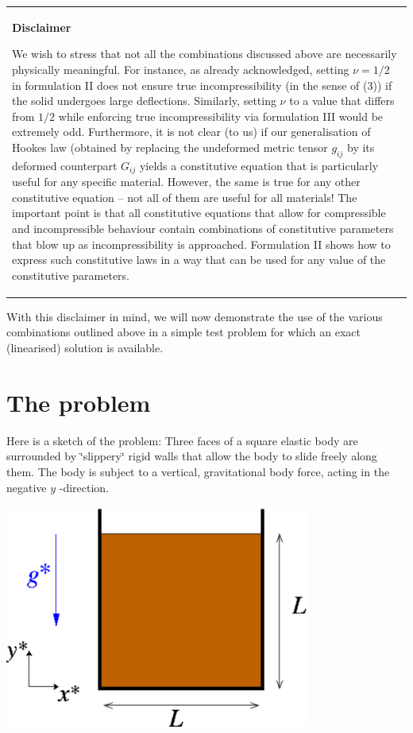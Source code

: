 \tabulinesep=1mm
\begin{longtabu} spread 0pt [c]{*{1}{|X[-1]}|}
\hline
\begin{center} {\bfseries Disclaimer} \end{center}  We wish to stress that not all the combinations discussed above are necessarily physically meaningful. For instance, as already acknowledged, setting $ \nu = 1/2 $ in formulation II does not ensure true incompressibility (in the sense of (3)) if the solid undergoes large deflections. Similarly, setting $ \nu $ to a value that differs from $ 1/2 $ while enforcing true incompressibility via formulation I\+II would be extremely odd. Furthermore, it is not clear (to us) if our generalisation of Hooke\textquotesingle{}s law (obtained by replacing the undeformed metric tensor $ g_{ij} $ by its deformed counterpart $ G_{ij} $ yields a constitutive equation that is particularly useful for any specific material. However, the same is true for any other constitutive equation -- not all of them are useful for all materials! The important point is that all constitutive equations that allow for compressible and incompressible behaviour contain combinations of constitutive parameters that blow up as incompressibility is approached. Formulation II shows how to express such constitutive laws in a way that can be used for any value of the constitutive parameters.   \\
\end{longtabu}


With this disclaimer in mind, we will now demonstrate the use of the various combinations outlined above in a simple test problem for which an exact (linearised) solution is available.



 

\hypertarget{index_problem}{}\section{The problem}\label{index_problem}
Here is a sketch of the problem\+: Three faces of a square elastic body are surrounded by \char`\"{}slippery\char`\"{} rigid walls that allow the body to slide freely along them. The body is subject to a vertical, gravitational body force, acting in the negative $ y $ -\/direction.

 
\begin{DoxyImage}
\includegraphics[width=0.75\textwidth]{sketch}
\end{DoxyImage}


